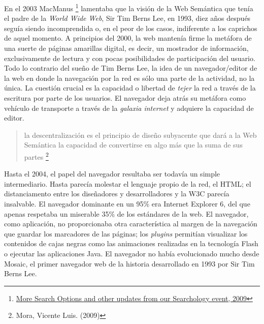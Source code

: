 \documentclass[12pt, a4paper,twoside]{book}
\begin{document}
En el 2003 MacManus%
\footnote{\href{http://googleblog.blogspot.com/2009/05/more-search-options-and-other-updates.html}{More Search Options and other updates from our Searchology event, 2009}}
lamentaba que la visión de la Web Semántica que tenía el padre de
la \emph{World Wide Web}, Sir Tim Berns Lee, en 1993, diez años
después seguía siendo incomprendida o, en el peor de los casos,
indiferente a los caprichos de aquel momento. A principios del
2000, la web mantenía firme la metáfora de una suerte de páginas
amarillas digital, es decir, un mostrador de información,
exclusivamente de lectura y con pocas posibilidades de
participación del usuario. Todo lo contrario del sueño de Tim Berns
Lee, la idea de un navegador/editor de la web en donde la
navegación por la red es sólo una parte de la actividad, no la
única. La cuestión crucial es la capacidad o libertad de
\emph{tejer} la red a través de la escritura por parte de los
usuarios. El navegador deja atrás su metáfora como vehículo de
transporte a través de la \emph{galaxia internet} y adquiere la
capacidad de editor.

\begin{quote}
la descentralización es el principio de diseño subyacente que dará
a la Web Semántica la capacidad de convertirse en algo más que la
suma de sus partes%
\footnote{Mora, Vicente Luis. (2009)}

\end{quote}
Hasta el 2004, el papel del navegador resultaba ser todavía un
simple intermediario. Hasta parecía molestar el lenguaje propio de
la red, el HTML; el distanciamento entre los diseñadores y
desarrolladores y la W3C parecía insalvable. El navegador dominante
en un 95\% era Internet Explorer 6, del que apenas respetaba un
miserable 35\% de los estándares de la web. El navegador, como
aplicación, no proporcionaba otra característica al margen de la
navegación que guardar los marcadores de las páginas; los
\emph{plugins} permitían visualizar los contenidos de cajas negras
como las animaciones realizadas en la tecnología Flash o ejecutar
las aplicaciones Java. El navegador no había evolucionado mucho
desde Mosaic, el primer navegador web de la historia desarrollado
en 1993 por Sir Tim Berns Lee.
\end{document}
